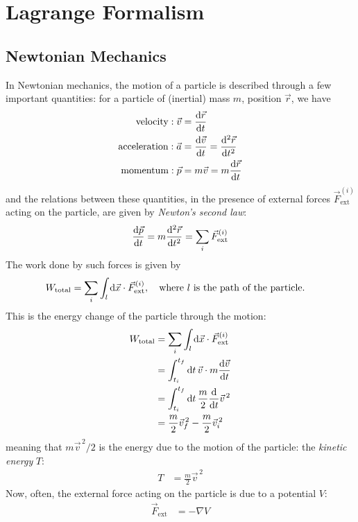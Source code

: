 \section{Lagrange Formalism}
\subsection{Newtonian Mechanics}
In Newtonian mechanics, the motion of a particle is described through a few important quantities:
for a particle of (inertial) mass $m$, position $\vec{r}$, we have
\begin{align}
  \text{velocity}: \vec{v}     & = \odv{\vec{r}}{t}                       \\
  \text{acceleration}: \vec{a} & = \odv{\vec{v}}{t} = \odv[2]{\vec{r}}{t} \\
  \text{momentum}: \vec{p}     & = m\vec{v} = m\odv{\vec{r}}{t}
\end{align}
and the relations between these quantities, in the presence of external forces $\vec{F}_{\text{ext}}^{(i)}$ acting on the particle, are given by \textit{Newton's second law}:
\begin{align}
  \odv{\vec{p}}{t} = m \odv[2]{\vec{r}}{t} = \sum_i \vec{F}_{\text{ext}}^{(i)}
\end{align}
The work done by such forces is given by
\begin{align}
  W_{\text{total}} & = \sum_i \int_l \odif{\vec{x}} \cdot \vec{F}_{\text{ext}}^{(i)}, \quad \text{where } l \text{ is the path of the particle.}
\end{align}
This is the energy change of the particle through the motion:
\begin{align}
  W_{\text{total}}
   & = \sum_i \int_l \odif{\vec{x}} \cdot \vec{F}_{\text{ext}}^{(i)}     \\
   & = \int_{t_i}^{t_f} \odif{t} \, \vec{v} \cdot m \odv{\vec{v}}{t}     \\
   & = \int_{t_i}^{t_f} \odif{t} \, \frac{m}{2} \odv{}{t} \vec{v}^{\, 2} \\
   & = \frac{m}{2} \vec{v}_f^{\, 2} - \frac{m}{2} \vec{v}_i^{\, 2}
\end{align}
meaning that $m \vec{v}^{\, 2} / 2$ is the energy due to the motion of the particle: the \emph{kinetic energy} $T$:
\begin{align}
  T & = \frac{m}{2} \vec{v}^{\, 2}
\end{align}
Now, often, the external force acting on the particle is due to a potential $V$:
\begin{align}
  \vec{F}_{\text{ext}} & = -\nabla V
\end{align}
